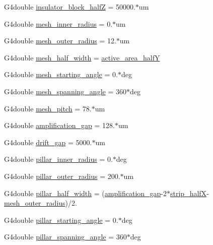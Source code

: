 \begin{DoxyCompactItemize}
\item 
G4double \hyperlink{structUMConfig_ac37bdc75ee79cf798d480466ad3fde13}{insulator\+\_\+block\+\_\+half\+Z} = 50000.$\ast$um
\item 
G4double \hyperlink{structUMConfig_a779b130ea0412d60509556a1342071a5}{mesh\+\_\+inner\+\_\+radius} = 0.$\ast$um
\item 
G4double \hyperlink{structUMConfig_a3ae6c3881d3bc76057e8fe9ffbdeaf66}{mesh\+\_\+outer\+\_\+radius} = 12.$\ast$um
\item 
G4double \hyperlink{structUMConfig_ad589fe0f446c4d020ddf0c009fe0314a}{mesh\+\_\+half\+\_\+width} = \hyperlink{structUMConfig_a5f1596eab9aa3565950c73754dda39cb}{active\+\_\+area\+\_\+half\+Y}
\item 
G4double \hyperlink{structUMConfig_a068cd29afc69e9296e6da884e7b6c4ac}{mesh\+\_\+starting\+\_\+angle} = 0.$\ast$deg
\item 
G4double \hyperlink{structUMConfig_a777f6e7384a40265f70f945c93c66820}{mesh\+\_\+spanning\+\_\+angle} = 360$\ast$deg
\item 
G4double \hyperlink{structUMConfig_a01eccb4b99640dc0d93bf74496c1184e}{mesh\+\_\+pitch} = 78.$\ast$um
\item 
G4double \hyperlink{structUMConfig_abd2d64e07e405d5274f562ba81dca4ae}{amplification\+\_\+gap} = 128.$\ast$um
\item 
G4double \hyperlink{structUMConfig_aa26902f3f2f43975c6c26b2f1addc301}{drift\+\_\+gap} = 5000.$\ast$um
\item 
G4double \hyperlink{structUMConfig_aa4b9f6ec239968ac2c4b4047b7ff32c5}{pillar\+\_\+inner\+\_\+radius} = 0.$\ast$deg
\item 
G4double \hyperlink{structUMConfig_ad952040a5b58ca3cbf4023319f4a2af6}{pillar\+\_\+outer\+\_\+radius} = 200.$\ast$um
\item 
G4double \hyperlink{structUMConfig_a0d4cb234021fd28b6cc327845d1db9cc}{pillar\+\_\+half\+\_\+width} = (\hyperlink{structUMConfig_abd2d64e07e405d5274f562ba81dca4ae}{amplification\+\_\+gap}-\/2$\ast$\hyperlink{structUMConfig_a0a439e9bae5313eae0b610d4fc48a92e}{strip\+\_\+half\+X}-\/\hyperlink{structUMConfig_a3ae6c3881d3bc76057e8fe9ffbdeaf66}{mesh\+\_\+outer\+\_\+radius})/2.
\item 
G4double \hyperlink{structUMConfig_a0dcfd82af061495badf0a1c322b38484}{pillar\+\_\+starting\+\_\+angle} = 0.$\ast$deg
\item 
G4double \hyperlink{structUMConfig_a6404764724906f77433b423292c7a3c0}{pillar\+\_\+spanning\+\_\+angle} = 360$\ast$deg
\item 

\end{DoxyCompactItemize}
